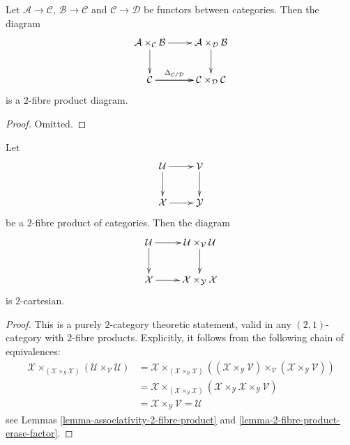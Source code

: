 \begin{lemma}
\label{lemma-fibre-product-after-map}
Let $\mathcal{A} \to \mathcal{C}$, $\mathcal{B} \to \mathcal{C}$
and $\mathcal{C} \to \mathcal{D}$ be functors between categories.
Then the diagram
$$
\xymatrix{
\mathcal{A} \times_\mathcal{C} \mathcal{B} \ar[d] \ar[r] &
\mathcal{A} \times_\mathcal{D} \mathcal{B} \ar[d] \\
\mathcal{C} \ar[r]^-{\Delta_{\mathcal{C}/\mathcal{D}}} \ar[r] &
\mathcal{C} \times_\mathcal{D} \mathcal{C}
}
$$
is a $2$-fibre product diagram.
\end{lemma}

\begin{proof}
Omitted.
\end{proof}

\begin{lemma}
\label{lemma-base-change-diagonal}
Let
$$
\xymatrix{
\mathcal{U} \ar[d] \ar[r] & \mathcal{V} \ar[d] \\
\mathcal{X} \ar[r] & \mathcal{Y}
}
$$
be a $2$-fibre product of categories. Then the diagram
$$
\xymatrix{
\mathcal{U} \ar[d] \ar[r] &
\mathcal{U} \times_\mathcal{V} \mathcal{U} \ar[d] \\
\mathcal{X} \ar[r] &
\mathcal{X} \times_\mathcal{Y} \mathcal{X}
}
$$
is $2$-cartesian.
\end{lemma}

\begin{proof}
This is a purely $2$-category theoretic statement, valid in any
$(2, 1)$-category with $2$-fibre products. Explicitly, it follows
from the following chain of equivalences:
\begin{align*}
\mathcal{X} \times_{(\mathcal{X} \times_\mathcal{Y} \mathcal{X})}
(\mathcal{U} \times_\mathcal{V} \mathcal{U})
& =
\mathcal{X} \times_{(\mathcal{X} \times_\mathcal{Y} \mathcal{X})}
((\mathcal{X} \times_\mathcal{Y} \mathcal{V})
\times_\mathcal{V} (\mathcal{X} \times_\mathcal{Y} \mathcal{V})) \\
& =
\mathcal{X} \times_{(\mathcal{X} \times_\mathcal{Y} \mathcal{X})}
(\mathcal{X} \times_\mathcal{Y} \mathcal{X}
\times_\mathcal{Y} \mathcal{V}) \\
& =
\mathcal{X} \times_\mathcal{Y} \mathcal{V} = \mathcal{U}
\end{align*}
see
Lemmas \ref{lemma-associativity-2-fibre-product} and
\ref{lemma-2-fibre-product-erase-factor}.
\end{proof}








